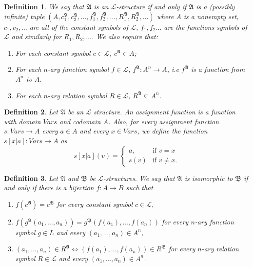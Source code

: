 \documentclass[leqno]{article}
\newtheorem{definition}{Definition}[section]
\newcommand{\lang}{\mathcal{L}}
\newcommand{\struct}[1]{\mathfrak{#1}}
\begin{document}
\begin{definition}
  We say that $\struct{A}$ is an $\lang$-structure if and only if $\struct{A}$ is a (possibly infinite) tuple $(A, c_1^\struct{A}, c_2^\struct{A}, \dots, f_1^\struct{A}, f_2^\struct{A}, \dots, R_1^\struct{A}, R_2^\struct{A}, \dots)$ where $A$ is a nonempty set, $c_1, c_2, \dots$ are all of the constant symbols of $\lang$, $f_1, f_2 \dots$ are the functions symbols of $\lang$ and similarly for $R_1, R_2, \dots$. We also require that:
  
  \begin{enumerate}
      \item For each constant symbol $c \in \lang$,  $c^\struct{A} \in A$;
      \item For each $n$-ary function symbol $f \in \lang$, $f^\struct{A}: A^n \to A$, i.e $f^\struct{A}$ is a function from $A^n$ to $A$. 
      \item For each $n$-ary relation symbol $R \in \lang$, $R^\struct{A} \subseteq A^n$.
  \end{enumerate}
\end{definition}

\begin{definition}
  Let $\struct{A}$ be an $\lang$ structure. An assignment function is a function with domain $Vars$ and codomain $A$. Also, for every assignment function $s : Vars \to A$ every $a \in A$ and every $x \in Vars$, we define the function $s[x|a] : Vars \to A$ as 
  \begin{equation*}
      s[x|a](v) = \begin{cases}
      a, & \text{if $v = x$} \\
      s(v) & \text{if $v \neq x$}.
      \end{cases}
  \end{equation*}
\end{definition}

\begin{definition} \label{def_isomorphicStructures}
  Let $\struct{A}$ and $\struct{B}$ be $\lang$-structures. We say that $\struct{A}$ is isomorphic to $\struct{B}$ if and only if there is a bijection $f: A \to B$ such that
  \begin{enumerate}
      \item $f(c^\struct{A}) = c^\struct{B}$ for every constant symbol $c \in \lang$,
      
      \item $f(g^\struct{A}(a_1, \dots, a_n)) = g^\struct{B}(f(a_1), \dots, f(a_n))$ for every $n$-ary function symbol $g \in L$ and every $(a_1, \dots, a_n) \in A^n$,
      
      \item $(a_1, \dots, a_n) \in R^\struct{A} \iff (f(a_1), \dots, f(a_n)) \in R^\struct{B}$ for every $n$-ary relation symbol $R \in \lang$ and every $(a_1, \dots, a_n) \in A^n$.
      
  \end{enumerate}
\end{definition}
\end{document}
